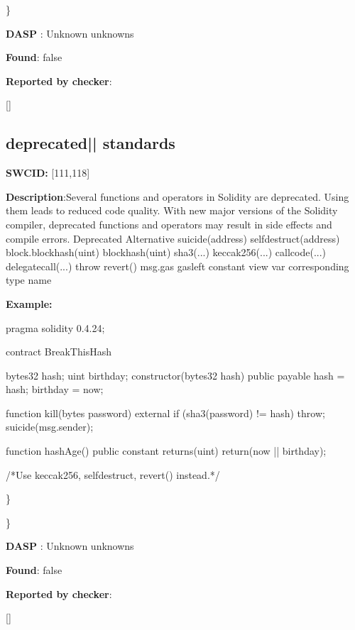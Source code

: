 \documentclass{article}
\begin{document}
\} 

\textbf{DASP} : Unknown unknowns

\textbf{Found}: false

\textbf{Reported by checker}: 
\begin{ffcode} 

[]
\end{ffcode} 
\subsection{deprecated{|\textunderscore| }standards} 
\textbf{SWC{\textunderscore }ID:} [111,118]

\textbf{Description}:Several functions and operators in Solidity are deprecated. Using them leads to reduced code quality. With new major versions of the Solidity compiler, deprecated functions and operators may result in side effects and compile errors.
  Deprecated              Alternative
  suicide(address)        selfdestruct(address)
  block.blockhash(uint)   blockhash(uint)
  sha3(...)               keccak256(...)
  callcode(...)           delegatecall(...)
  throw                   revert()
  msg.gas                 gasleft
  constant                view
  var                     corresponding type name


\textbf{Example:} 
\begin{ffcode} 

pragma solidity 0.4.24;

contract BreakThisHash {
    bytes32 hash;
    uint birthday;
    constructor(bytes32 \textunderscore hash) public payable {
        hash = \textunderscore hash;
        birthday = now;
    }

    function kill(bytes password) external {
        if (sha3(password) != hash) {
            throw;
        }
        suicide(msg.sender);
    }

    function hashAge() public constant returns(uint) {
        return(now |\textendash|  birthday);
    }
}

 /*Use keccak256, selfdestruct, revert() instead.*/ 

\end{ffcode} 
\} 

\} 

\textbf{DASP} : Unknown unknowns

\textbf{Found}: false

\textbf{Reported by checker}: 
\begin{ffcode} 

[]
\end{ffcode} 
\end{document}
